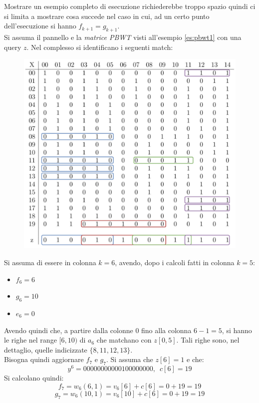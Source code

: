 \begin{esempio}
  \label{es:algo5}
  Mostrare un esempio completo di esecuzione richiederebbe troppo spazio quindi
  ci si limita a mostrare cosa succede nel caso in cui, ad un certo punto
  dell'esecuzione si hanno $f_{k+1}=g_{k+1}$.\\
  Si assuma il pannello e la \textit{matrice PBWT} visti all'esempio
  \ref{es:pbwt1} con una query $z$. Nel complesso si identificano i
  seguenti match:
  \begin{figure}[H]
    \centering
    \includegraphics[scale = 0.365]{img/pbwtmatch.pdf}
  \end{figure}
  Si assuma di essere in colonna $k=6$, avendo, dopo i calcoli fatti in colonna
  $k=5$: 
  \begin{itemize}
    \item $f_6=6$
    \item $g_6=10$
    \item $e_6=0$
  \end{itemize}
  Avendo quindi che, a partire dalla colonne $0$ fino alla colonna $6-1=5$, si
  hanno le righe nel range $[6,10)$ di $a_{6}$ che matchano con $z[0,5]$. Tali
  righe sono, nel dettaglio, quelle indicizzate $\{8, 11, 12, 13\}$.\\
  Bisogna quindi aggiornare $f_7$ e $g_7$. Si assuma che $z[6]=1$ e che:
  \[y^6=00000000000100000000,\,\,\,c[6]=19\]
  Si calcolano quindi:
  \[f_7=w_6(6,1)=v_6[6]+c[6]=0+19=19\]
  \[g_7=w_6(10,1)=v_6[10]+c[6]=0+19=19\]

\end{esempio}
